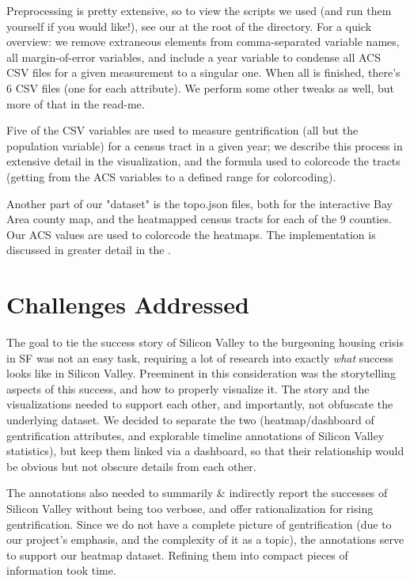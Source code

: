 \documentclass{article}
\begin{document}
    Preprocessing is pretty extensive, so to view the scripts we used (and run them yourself if you would like!), see our  at the root of the directory. For a quick overview: we remove extraneous elements from comma-separated variable names, all margin-of-error variables, and include a year variable to condense all ACS CSV files for a given measurement to a singular one. When all is finished, there's 6 CSV files (one for each attribute). We perform some other tweaks as well, but more of that in the read-me.

    Five of the CSV variables are used to measure gentrification (all but the population variable) for a census tract in a given year; we describe this process in extensive detail in the visualization, and the formula used to colorcode the tracts (getting from the ACS variables to a defined range for colorcoding).

    Another part of our "dataset" is the topo.json files, both for the interactive Bay Area county map, and the heatmapped census tracts for each of the 9 counties. Our ACS values are used to colorcode the heatmaps. The implementation is discussed in greater detail in the .

\section{Challenges Addressed}

    The goal to tie the success story of Silicon Valley to the burgeoning housing crisis in SF was not an easy task, requiring a lot of research into exactly \textit{what} success looks like in Silicon Valley. Preeminent in this consideration was the storytelling aspects of this success, and how to properly visualize it. The story and the visualizations needed to support each other, and importantly, not obfuscate the underlying dataset. We decided to separate the two (heatmap/dashboard of gentrification attributes, and explorable timeline annotations of Silicon Valley statistics), but keep them linked via a dashboard, so that their relationship would be obvious but not obscure details from each other.
    
    The annotations also needed to summarily \& indirectly report the successes of Silicon Valley without being too verbose, and offer rationalization for rising gentrification. Since we do not have a complete picture of gentrification (due to our project's emphasis, and the complexity of it as a topic), the annotations serve to support our heatmap dataset. Refining them into compact pieces of information took time.
    
\end{document}
